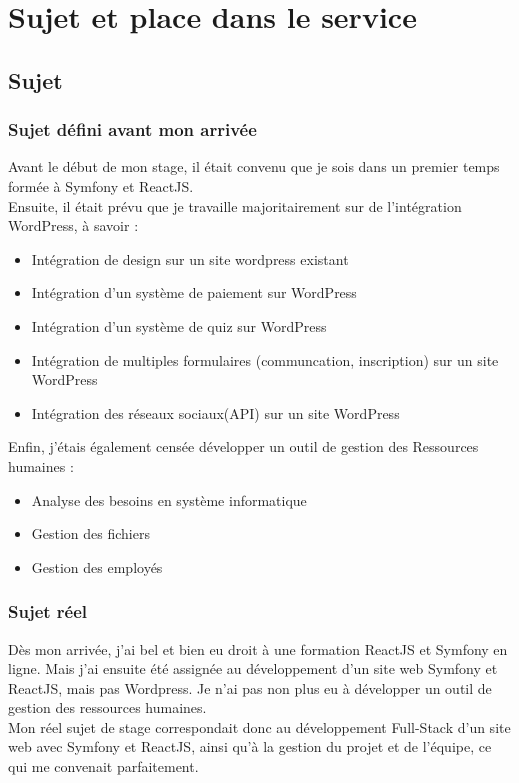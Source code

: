 \section{Sujet et place dans le service}
\subsection{Sujet}
\subsubsection{Sujet défini avant mon arrivée}

Avant le début de mon stage, il était convenu que je sois dans un premier temps formée à Symfony et ReactJS.
\\
Ensuite, il était prévu que je travaille majoritairement sur de l'intégration WordPress, à savoir :
\begin{itemize}
    \item Intégration de design sur un site wordpress existant
    \item Intégration d’un système de paiement sur WordPress
    \item Intégration d’un système de quiz sur WordPress
    \item Intégration de multiples formulaires (communcation, inscription) sur un site 
    WordPress
    \item Intégration des réseaux sociaux(API) sur un site WordPress
\end{itemize}
\bigbreak
Enfin, j'étais également censée développer un outil de gestion des Ressources humaines :
\begin{itemize}
    \item Analyse des besoins en système informatique
    \item Gestion des fichiers
    \item Gestion des employés
\end{itemize}


\subsubsection{Sujet réel}
Dès mon arrivée, j'ai bel et bien eu droit à une formation ReactJS et Symfony en ligne.
Mais j'ai ensuite été assignée au développement d'un site web Symfony et ReactJS, mais pas Wordpress.
Je n'ai pas non plus eu à développer un outil de gestion des ressources humaines. 
\\
Mon réel sujet de stage correspondait donc au développement Full-Stack d'un site web avec Symfony et ReactJS, 
ainsi qu'à la gestion du projet et de l'équipe, ce qui me convenait parfaitement.


